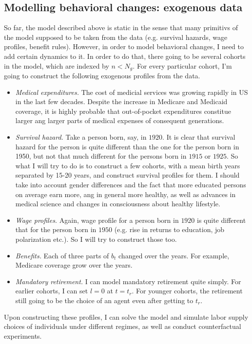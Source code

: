 \documentclass[
10pt, %
a4paper, %
oneside, %
headinclude,footinclude, %
BCOR5mm, %
]{scrartcl}
\begin{document}
\subsection{Modelling behavioral changes: exogenous data}
So far, the model described above is static in the sense that many primitivs of the model supposed to be taken from the data (e.g. survival hazards, wage profiles, benefit rules). However, in order to model behavioral changes, I need to add certain dynamics to it. In order to do that, there going to be several cohorts in the model, which are indexed by $n<N_g$. For every particular cohort, I'm going to construct the following exogenous profiles from the data. 
\begin{itemize}
\item \emph{Medical expenditures.} The cost of medicial services was growing rapidly in US in the last few decades. Despite the increase in Medicare and Medicaid coverage, it is highly probable that out-of-pocket expenditures constitue larger ang larger parts of medical expenses of consequent generations.
\item \emph{Survival hazard.} Take a person born, say, in $1920$. It is clear that survival hazard for the person is quite different than the one for the person born in 1950, but not that much different for the persons born in $1915$ or $1925$. So what I will try to do is to construct a few cohorts, with a mean birth years separated by 15-20 years, and construct survival profiles for them. I should take into account gender differences and the fact that more educated persons on average earn more, ang in general more healthy, as well as advances in medical science and changes in consciousness about healthy lifestyle.
\item \emph{Wage profiles.} Again, wage profile for a person born in $1920$ is quite different that for the person born in $1950$ (e.g. rise in returns to education, job polarization etc.). So I will try to construct those too.
\item \emph{Benefits.} Each of three parts of $b_t$ changed over the years. For example, Medicare coverage grow over the years.
\item \emph{Mandatory retirement.} I can model mandatory retirement quite simply. For earlier cohorts, I can set $l=0$ at $t = t_r$. For younger cohorts, the retirement still going to be the choice of an agent even after getting to $t_r$.
\end{itemize}

Upon constructing these profiles, I can solve the model and simulate labor supply choices of individuals under different regimes, as well as conduct counterfactual experiments.
\end{document}
